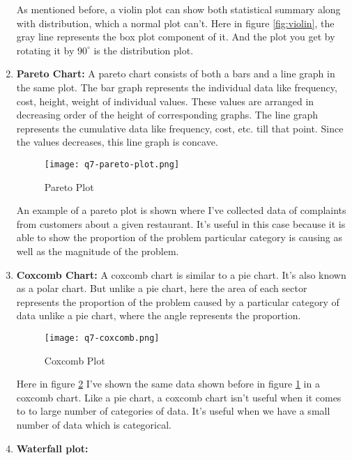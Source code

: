 \begin{tcolorbox}[breakable]
\begin{sol}
\begin{enumerate}
			      As mentioned before, a violin plot can show both
			      statistical summary along with distribution,
			      which a normal plot can't. Here in figure
			      \ref{fig:violin}, the gray line represents the
			      box plot component of it. And the plot you get by
			      rotating it by $90^\circ$ is the distribution
			      plot.
			\item \textbf{Pareto Chart:}
			      A pareto chart consists of both a bars and a line
			      graph in the same plot. The bar graph represents
			      the individual data like frequency, cost, height,
			      weight of individual values. These values are
			      arranged in decreasing order of the height of
			      corresponding graphs. The line graph represents
			      the cumulative data like frequency, cost, etc.
			      till that point. Since the values decreases, this
			      line graph is concave.
			      \begin{figure}[H]
				      \centering
				      \texttt{[image: q7-pareto-plot.png]}
				      \caption{Pareto Plot}
				      \label{fig:pareto}
			      \end{figure}
			      An example of a pareto plot is shown where I've
			      collected data of complaints from customers about
			      a given restaurant. It's useful in this case
			      because it is able to show the proportion of the
			      problem particular category is causing as well as
			      the magnitude of the problem.
			\item \textbf{Coxcomb Chart:}
			      A coxcomb chart is similar to a pie chart. It's
			      also known as a polar chart. But unlike a pie
			      chart, here the area of each sector represents the
			      proportion of the problem caused by a particular
			      category of data unlike a pie chart, where the
			      angle represents the proportion.
			      \begin{figure}[H]
				      \centering
				      \texttt{[image: q7-coxcomb.png]}
				      \caption{Coxcomb Plot}
				      \label{fig:coxcomb}
			      \end{figure}
			      Here in figure \ref{fig:coxcomb} I've shown the
			      same data shown before in figure \ref{fig:pareto}
			      in a coxcomb chart. Like a pie chart, a coxcomb
			      chart isn't useful when it comes to to large
			      number of categories of data. It's useful when we
			      have a small number of data which is categorical.
			\item \textbf{Waterfall plot:}

\end{enumerate}
\end{sol}
\end{tcolorbox}

